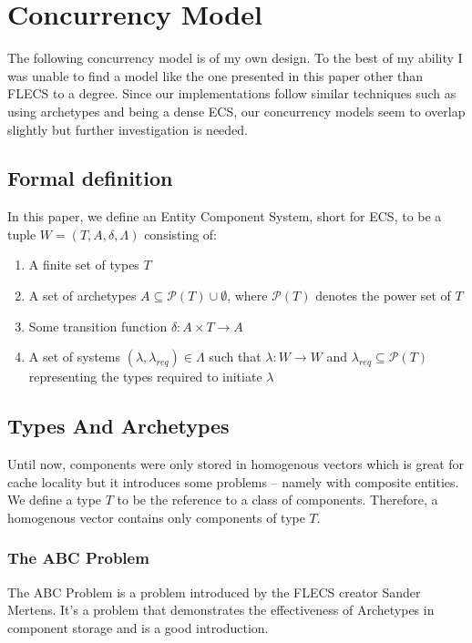
\section{Concurrency Model}
The following concurrency model is of my own design. To the best of my ability I was unable to find a model like the one presented in this paper other than FLECS to a degree. Since our implementations follow similar techniques such as using archetypes and being a dense ECS, our concurrency models seem to overlap slightly but further investigation is needed.

\subsection{Formal definition} \label{section:formal_definition}
In this paper, we define an Entity Component System, short for ECS, to be a tuple $W = (T, A, \delta, \Lambda)$ consisting of:
\begin{enumerate}
    \item A finite set of types $T$
    \item A set of archetypes $A \subseteq \mathcal{P}(T) \cup \emptyset$, where $\mathcal{P}(T)$ denotes the power set of $T$    
    \item Some transition function $\delta : A \times T \rightarrow A$
    \item A set of systems $(\lambda, \lambda_{req}) \in \Lambda$ such that $\lambda : W \rightarrow W$ and $\lambda_{req} \subseteq \mathcal{P}(T)$ representing the types required to initiate $\lambda$
\end{enumerate}

\subsection{Types And Archetypes}
Until now, components were only stored in homogenous vectors which is great for cache locality but it introduces some problems -- namely with composite entities. We define a type $T$ to be the reference to a class of components. Therefore, a homogenous vector contains only components of type $T$.

\subsubsection{The ABC Problem}
The ABC Problem is a problem introduced by the FLECS creator Sander Mertens. It's a problem that demonstrates the effectiveness of Archetypes in component storage and is a good introduction.

